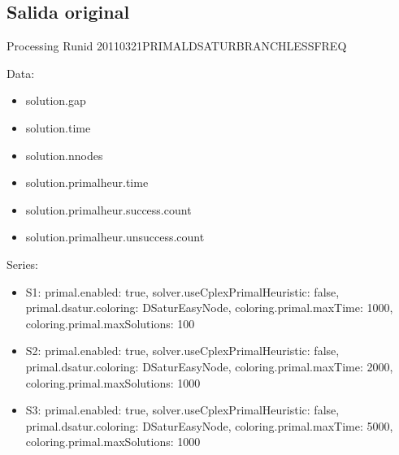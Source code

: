\documentclass[landscape, 12pt]{report}
\begin{document}
\subsection*{Salida original}

Processing Runid 20110321PRIMALDSATURBRANCHLESSFREQ


Data:
\begin{itemize}
\item solution.gap
\item solution.time
\item solution.nnodes
\item solution.primalheur.time
\item solution.primalheur.success.count
\item solution.primalheur.unsuccess.count
\end{itemize}
Series:
\begin{itemize}
\item S1: primal.enabled: true, solver.useCplexPrimalHeuristic: false, primal.dsatur.coloring: DSaturEasyNode, coloring.primal.maxTime: 1000, coloring.primal.maxSolutions: 100
\item S2: primal.enabled: true, solver.useCplexPrimalHeuristic: false, primal.dsatur.coloring: DSaturEasyNode, coloring.primal.maxTime: 2000, coloring.primal.maxSolutions: 1000
\item S3: primal.enabled: true, solver.useCplexPrimalHeuristic: false, primal.dsatur.coloring: DSaturEasyNode, coloring.primal.maxTime: 5000, coloring.primal.maxSolutions: 1000
\end{itemize}
\end{document}
